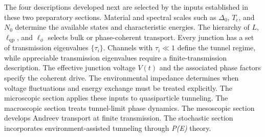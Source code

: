             The four descriptions developed next are selected by the inputs established in these two preparatory sections. Material and spectral scales such as $\Delta_0$, $T_\mathrm{c}$, and $N_0$ determine the available states and characteristic energies. The hierarchy of $L$, $\ell_\mathrm{qp}$, and $\ell_\phi$ selects bulk or phase-coherent transport. Every junction has a set of transmission eigenvalues $\{\tau_i\}$. Channels with $\tau_i\ll1$ define the tunnel regime, while appreciable transmission eigenvalues require a finite-transmission description. The effective junction voltage $V(t)$ and the associated phase factors specify the coherent drive. The environmental impedance determines when voltage fluctuations and energy exchange must be treated explicitly. The microscopic section applies these inputs to quasiparticle tunneling. The macroscopic section treats tunnel-limit phase dynamics. The mesoscopic section develops Andreev transport at finite transmission. The stochastic section incorporates environment-assisted tunneling through \textit{P(E)} theory.
